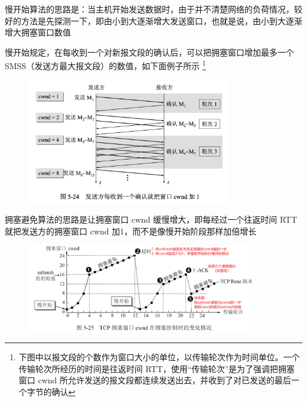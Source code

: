 \documentclass[cs4size,a4paper,10pt]{ctexart}
\begin{document}
	慢开始算法的思路是：当主机开始发送数据时，由于并不清楚网络的负荷情况，较好的方法是先探测一下，即由小到大逐渐增大发送窗口，也就是说，由小到大逐渐增大拥塞窗口数值

	慢开始规定，在每收到一个对新报文段的确认后，可以把拥塞窗口增加最多一个 SMSS（发送方最大报文段）的数值，如下面例子所示
	\footnote{下图中以报文段的个数作为窗口大小的单位，以传输轮次作为时间单位。一个传输轮次所经历的时间是往返时间 RTT，使用“传输轮次”是为了强调把拥塞窗口 cwnd 所允许发送的报文段都连续发送出去，并收到了对已发送的最后一个字节的确认}

	\begin{figure}[H]
		\centering
		\includegraphics[width=0.8\textwidth]{img/5.24}
	\end{figure}

	拥塞避免算法的思路是让拥塞窗口 cwnd 缓慢增大，即每经过一个往返时间 RTT 就把发送方的拥塞窗口 cwnd 加1，而不是像慢开始阶段那样加倍增长

	\begin{figure}[H]
		\centering
		\includegraphics[width=0.9\textwidth]{img/5.25}
	\end{figure}
\end{document}
